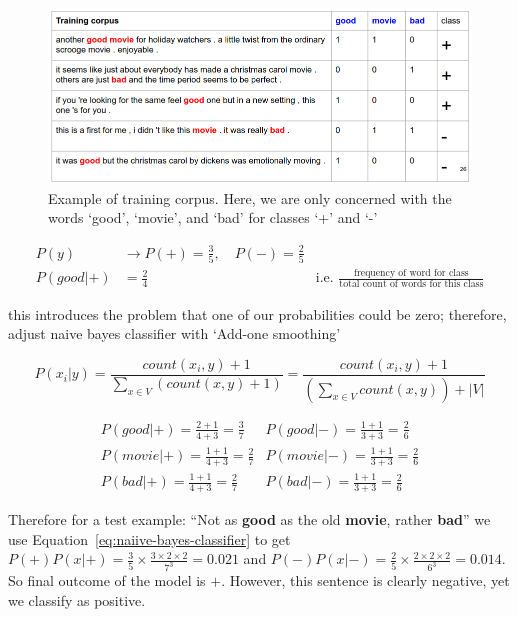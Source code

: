 \documentclass[11pt]{article}
\begin{document}
\begin{figure}[H]
    \centering
    \includegraphics*[width=\linewidth]{figures/example.png}
    \caption{Example of training corpus. Here, we are only concerned with the words `good', `movie', and `bad' for classes `+' and `-'}
\end{figure}

\begin{align*}
    P(y) & \rightarrow P(+) = \frac 3 5, \quad P(-) = \frac 2 5 \\ 
    P(good|+) & = \frac 2 4 & \text{i.e. } \frac{\text{frequency of word for class}}{\text{total count of words for this class}}
\end{align*}

this introduces the problem that one of our probabilities could be zero; therefore, adjust naive bayes classifier with `Add-one smoothing'

\begin{definition}\label{eq:add-one-smoothing}
    \begin{equation*}
        P(x_i|y) = \frac{count(x_i,y)+1}{\sum_{x\in V}(count(x,y)+1)} = \frac{count(x_i, y) + 1}{(\sum_{x\in V} count(x,y)) + |V|}
    \end{equation*}
\end{definition}

\begin{align*}
    P(good|+) = \frac {2 + 1} {4 + 3} = \frac 3 7 & P(good|-) = \frac{1 + 1}{3 + 3} = \frac 2 6 \\
    P(movie|+) = \frac{1 + 1}{4 + 3} = \frac 2 7  & P(movie|-) = \frac{1 + 1}{3 + 3} = \frac 2 6  \\
    P(bad|+) = \frac{1 + 1}{4 + 3} = \frac 2 7  & P(bad|-) = \frac{1 + 1}{3 + 3} = \frac 2 6
\end{align*} 

Therefore for a test example: ``Not as \textbf{good} as the old \textbf{movie}, rather \textbf{bad}'' we use Equation~\ref{eq:naiive-bayes-classifier} to get $P(+)P(x|+) = \frac 3 5 \times \frac{3\times 2 \times 2}{7^3} = 0.021$ and $P(-)P(x|-) = \frac 2 5 \times \frac{2\times 2 \times 2}{6^3} = 0.014$. So final outcome of the model is $+$. However, this sentence is clearly negative, yet we classify as positive.
\end{document}
